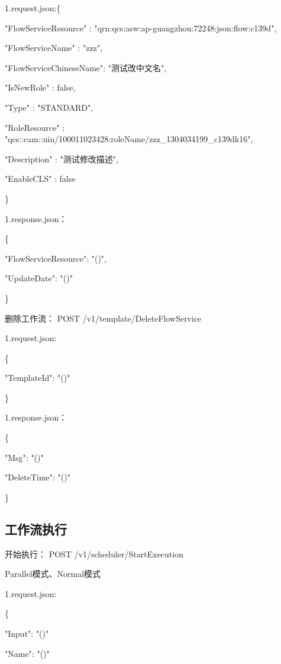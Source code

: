 1.request.json:\{

    "FlowServiceResource"   : "qrn:qcs:asw:ap-guangzhou:72248:json:flow:c139d",


    "FlowServiceName"       :  "zzz",

    "FlowServiceChineseName":  "测试改中文名",

    "IsNewRole"             :  false,

    "Type"                  :  "STANDARD",

    "RoleResource"          :  "qcs::cam::uin/100011023428:roleName/zzz\_1304034199\_c139dk16",

    "Description"           :  "测试修改描述",

    "EnableCLS"             :  false

\}

1.response.json：

\{

"FlowServiceResource": "\@notEmpty()",

"UpdateDate": "\@notEmpty()"

\}

删除工作流：
POST /v1/template/DeleteFlowService

1.request.json:

\{

    "TemplateId": "\@exists()"

\}


1.response.json：

\{

    "Msg": "\@exists()"

    "DeleteTime": "\@exists()"

\}


\subsection{工作流执行}
开始执行：
POST /v1/scheduler/StartExecution

Parallel模式、Normal模式

1.request.json:

\{

"Input": "\@exists()"

"Name": "\@notEmpty()"

